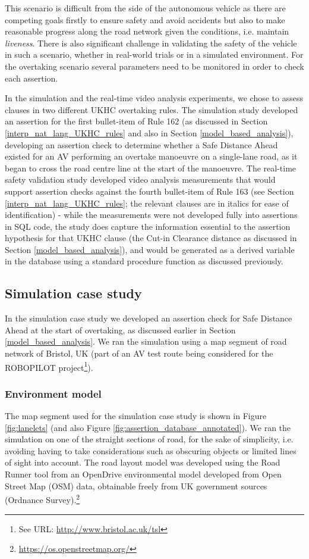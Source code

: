 This scenario is difficult from the side of the autonomous vehicle as there are competing goals firstly to ensure safety and avoid accidents but also to make reasonable progress along the road network given the conditions, i.e. maintain \textit{liveness}. There is also significant challenge in validating the safety of the vehicle in such a scenario, whether in real-world trials or in a simulated environment. For the overtaking scenario several parameters need to be monitored in order to check each assertion. 

In the simulation and the real-time video analysis experiments, we chose to assess clauses in two different UKHC overtaking rules. The simulation study developed an assertion for the first bullet-item of Rule 162 (as discussed in Section \ref{interp_nat_lang_UKHC_rules} and also in Section \ref{model_based_analysis}), developing an assertion check to determine whether a Safe Distance Ahead existed for an AV performing an overtake manoeuvre on a single-lane road, as it began to cross the road centre line at the start of the manoeuvre. The real-time safety validation study developed video analysis measurements that would support assertion checks against the fourth bullet-item of Rule 163 (see Section \ref{interp_nat_lang_UKHC_rules}; the relevant clauses are in italics for ease of identification) - while the measurements were not developed fully into assertions in SQL code, the study does capture the information essential to the assertion hypothesis for that UKHC clause (the Cut-in Clearance distance as discussed in Section \ref{model_based_analysis}), and would be generated as a derived variable in the database using a standard procedure function as discussed previously.

\subsection{Simulation case study}  \label{sim_case_study}
In the simulation case study we developed an assertion check for Safe Distance Ahead at the start of overtaking, as discussed earlier in Section \ref{model_based_analysis}. We ran the simulation using a map segment of road network of Bristol, UK (part of an AV test route being considered for the ROBOPILOT project\footnote{See URL: \url{http://www.bristol.ac.uk/tsl}}).

\subsubsection{Environment model}
The map segment used for the simulation case study is shown in Figure \ref{fig:lanelets} (and also Figure \ref{fig:assertion_database_annotated}). We ran the simulation on one of the straight sections of road, for the sake of simplicity, i.e. avoiding having to take considerations such as obscuring objects or limited lines of sight into account. The road layout model was developed using the Road Runner tool from an OpenDrive environmental model developed from Open Street Map (OSM) data, obtainable freely from UK government sources (Ordnance Survey).\footnote{\url{https://os.openstreetmap.org/}} 

